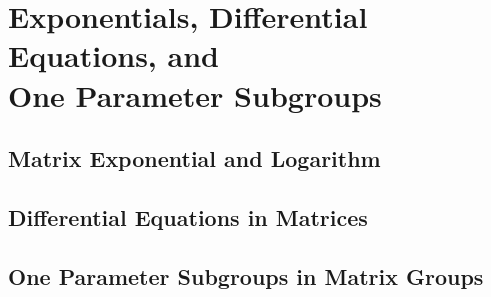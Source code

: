 \chapter{Exponentials, Differential Equations, and \\One Parameter Subgroups}

\section{Matrix Exponential and Logarithm}

\section{Differential Equations in Matrices}

\section{One Parameter Subgroups in Matrix Groups}

